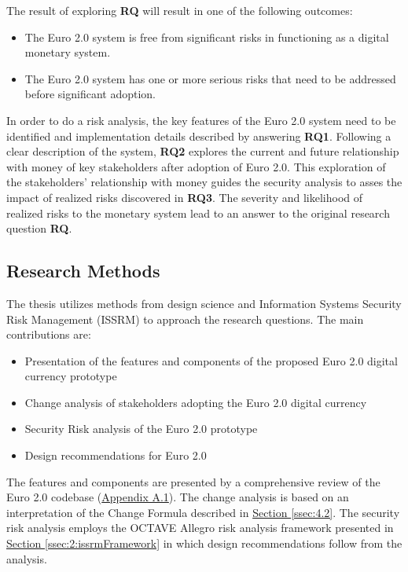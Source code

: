 \documentclass[a4paper,12pt]{article} %
\newcommand{\hypersectionref}[1]{\hyperref[#1]{Section \ref{#1}}}
\begin{document}
The result of exploring \textbf{RQ} will result in one of the following outcomes:
\begin{itemize}
	\item The Euro 2.0 system is free from significant risks in functioning as a digital monetary system.
	\item The Euro 2.0 system has one or more serious risks that need to be addressed before significant adoption.
\end{itemize}

In order to do a risk analysis, the key features of the Euro 2.0 system need to be identified and implementation details described by answering \textbf{RQ1}. Following a clear description of the system, \textbf{RQ2} explores the current and future relationship with money of key stakeholders after adoption of Euro 2.0. This exploration of the stakeholders' relationship with money guides the security analysis to asses the impact of realized risks discovered in \textbf{RQ3}. The severity and likelihood of realized risks to the monetary system lead to an answer to the original research question \textbf{RQ}.

\subsection{Research Methods} \label{ssec:1.3}
The thesis utilizes methods from design science and Information Systems Security Risk Management (ISSRM) to approach the research questions. The main contributions are:
\begin{itemize}
	\item Presentation of the features and components of the proposed Euro 2.0 digital currency prototype
	\item Change analysis of stakeholders adopting the Euro 2.0 digital currency
	\item Security Risk analysis of the Euro 2.0 prototype
	\item Design recommendations for Euro 2.0
\end{itemize}

The features and components are presented by a comprehensive review of the Euro 2.0 codebase (\hyperref[ssec:a.1]{Appendix A.1}). The change analysis is based on an interpretation of the Change Formula\cite{changeFormula2014} described in \hypersectionref{ssec:4.2}. The security risk analysis employs the OCTAVE Allegro risk analysis framework presented in \hypersectionref{ssec:2:issrmFramework} in which design recommendations follow from the analysis.
\end{document}
